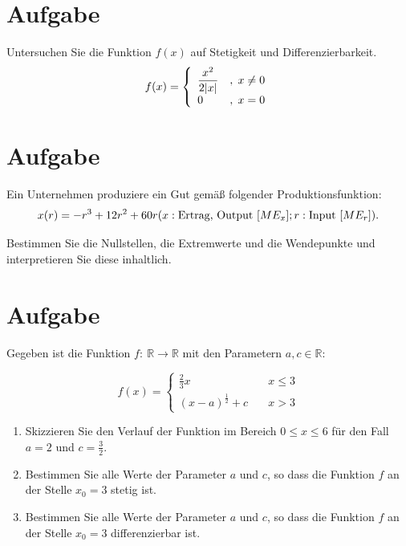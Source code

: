 \documentclass[fontsize=11pt, parskip=half]{scrartcl}
\newcommand{\R}{\mathbb{R}}
\begin{document}
\section{Aufgabe}%
Untersuchen Sie die Funktion $f(x)$ auf Stetigkeit und
Differenzierbarkeit.
\[ f(x)=\left\{ \begin{array}{ll}
\displaystyle{\frac{x^2}{2|x|}} & ,\hspace{0.1cm} x \not= 0 \\
0 & ,\hspace{0.1cm} x=0
\end{array} \right. \]


%
%
%


\section{Aufgabe}%

Ein Unternehmen produziere ein Gut gemä{\ss} folgender
Produktionsfunktion:
\[x(r)=-r^3+12r^2+60r\\
(x: \mbox{Ertrag, Output } [ME_x]; r: \mbox{Input } [ME_r]).\]

Bestimmen Sie die Nullstellen, die Extremwerte und die Wendepunkte
und interpretieren Sie diese inhaltlich.



\section{Aufgabe}Gegeben ist die Funktion $f:\ \R \rightarrow \R$ mit den
Parametern $a, c \in \R$:

$$ f(x)=\left\{\begin{array}{ll} \frac{2}{3}x \quad & x\leq 3 \\[0.3cm]
           (x-a)^{\frac{1}{2}}+ c \quad & x > 3 \end{array}\right.$$

\begin{enumerate}
\item Skizzieren Sie den Verlauf der Funktion im Bereich $0 \leq x \leq 6 $ für den Fall $a = 2$ und $c = \frac{3}{2}$.
\item Bestimmen Sie alle Werte der Parameter $a$ und $c$, so dass die
Funktion $f$ an der Stelle $x_0=3$ stetig ist.
\item Bestimmen Sie alle Werte der Parameter $a$ und $c$, so dass die
Funktion $f$ an der Stelle $x_0=3$ differenzierbar ist.
\end{enumerate}
\end{document}

